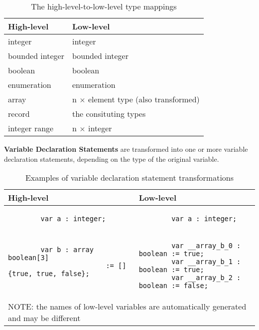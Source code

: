 \begin{table}[ht]
	\footnotesize
	\centering
	\begin{tabular}{ l l }
		\toprule
		High-level & Low-level \\
		\midrule
		integer & integer \\
		bounded integer & bounded integer \\
		boolean & boolean  \\
		enumeration & enumeration  \\
		array & n $\times$ element type (also transformed)  \\
		record & the consituting types  \\
		integer range & n $\times$ integer  \\
		\bottomrule
	\end{tabular}
	\caption{The high-level-to-low-level type mappings}
	\label{tab:SCLLTypeMapping}
\end{table}

\bigskip
\textbf{Variable Declaration Statements} are transformed into one or more variable declaration statements, depending on the type of the original variable.

\begin{table}[ht]
	\footnotesize
	\centering
	\begin{tabular}{ p{7cm} p{7cm} }
		\toprule
		High-level & Low-level \\
		\midrule
		\begin{lstlisting}
		var a : integer;\end{lstlisting} & 
		\begin{lstlisting}
		var a : integer;\end{lstlisting} \\
		\begin{lstlisting}
		var b : array boolean[3]  
						:= []{true, true, false};
				
					\end{lstlisting} & 
		\begin{lstlisting}
		var __array_b_0 : boolean := true;
		var __array_b_1 : boolean := true;
		var __array_b_2 : boolean := false;
		\end{lstlisting} \\
		\bottomrule
		\multicolumn{2}{l}{NOTE: the names of low-level variables are automatically generated and may be different}
	\end{tabular}
	\caption{Examples of variable declaration statement transformations}
	\label{tab:SCLLVariableDeclarationExample}
\end{table}

